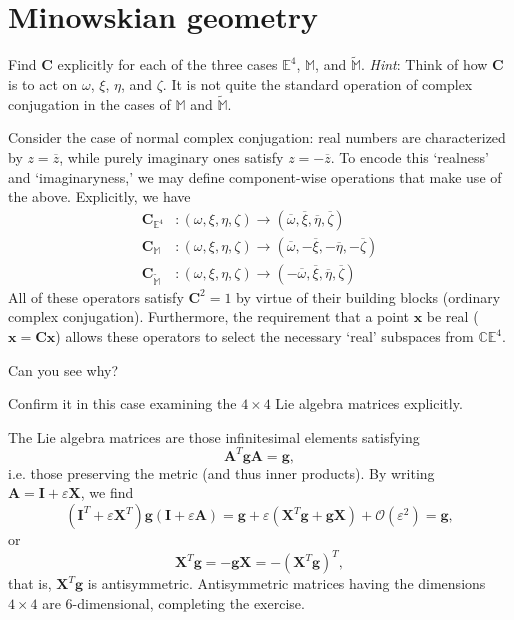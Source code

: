 \documentclass[../road-to-reality.tex]{subfiles}
\begin{document}
\section{Minowskian geometry}

\begin{questions}
  
\question Find $\mathbf{C}$ explicitly for each of the three cases $\mathbb{E}^4$, $\mathbb{M}$, and $\tilde{\mathbb{M}}$. \textit{Hint}: Think of how $\mathbf{C}$ is to act on $\omega$, $\xi$, $\eta$, and $\zeta$. It is not quite the standard operation of complex conjugation in the cases of $\mathbb{M}$ and $\tilde{\mathbb{M}}$.

  \begin{solution}
    Consider the case of normal complex conjugation: real numbers are characterized by $z = \overline{z}$, while purely imaginary ones satisfy $z = -\overline{z}$. To encode this `realness' and `imaginaryness,' we may define component-wise operations that make use of the above. Explicitly, we have
    \begin{align*}
      \mathbf{C}_{\mathbb{E}^4} &: (\omega, \xi, \eta, \zeta) \to (\overline{\omega}, \overline{\xi}, \overline{\eta}, \overline{\zeta}) \\	
      \mathbf{C}_{\mathbb{M}} &: (\omega, \xi, \eta, \zeta) \to (\overline{\omega}, {-\overline{\xi}}, {-\overline{\eta}}, {-\overline{\zeta}}) \\
      \mathbf{C}_{\tilde{\mathbb{M}}} &: (\omega, \xi, \eta, \zeta) \to ({-\overline{\omega}}, \overline{\xi}, \overline{\eta}, \overline{\zeta})
    \end{align*}
    All of these operators satisfy $\mathbf{C}^2=1$ by virtue of their building blocks (ordinary complex conjugation). Furthermore, the requirement that a point $\mathbf{x}$ be real ($\mathbf{x} = \mathbf{Cx}$) allows these operators to select the necessary `real' subspaces from $\mathbb{CE}^4$.
  \end{solution}

\question Can you see why?

\question Confirm it in this case examining the $4\times{4}$ Lie algebra matrices explicitly.

  \begin{solution}
    The Lie algebra matrices are those infinitesimal elements satisfying
    \[
      \mathbf{A}^T\mathbf{gA} = \mathbf{g}
      ,\] 
    i.e. those preserving the metric (and thus inner products). By writing $\mathbf{A} = \mathbf{I} + \varepsilon\mathbf{X}$, we find
    \[
      (\mathbf{I}^T + \varepsilon\mathbf{X}^T)\mathbf{g}(\mathbf{I} + \varepsilon\mathbf{A}) = \mathbf{g} + \varepsilon(\mathbf{X}^T\mathbf{g} + \mathbf{g}\mathbf{X}) + \mathcal{O}(\varepsilon^2) = \mathbf{g}
      ,\] 
    or
    \[
      \mathbf{X}^T\mathbf{g} = -\mathbf{g}\mathbf{X} = -(\mathbf{X}^T\mathbf{g})^T
      ,\] 
    that is, $\mathbf{X}^T\mathbf{g}$ is antisymmetric. Antisymmetric matrices having the dimensions $4\times{4}$ are $6$-dimensional, completing the exercise.
    

\end{solution}
\end{questions}
\end{document}
